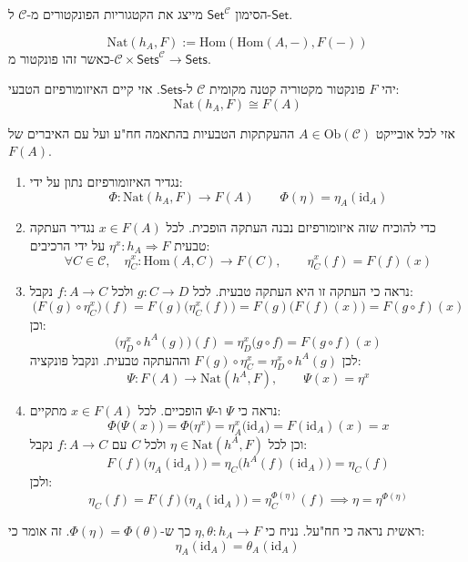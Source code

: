 \documentclass{tstextbook}
\begin{document}
\begin{reminder}
הסימון \(\mathsf{Set}^{\mathcal{C}}\) מייצג את הקטגוריות הפונקטורים מ-\(\mathcal{C}\) ל-\(\mathsf{Set}\).

\end{reminder}
\begin{definition}
$$\mathrm{{Nat}}(h_{A},F):=\mathrm{{Hom}}(\mathrm{{Hom}}(A,-),F(-))$$
כאשר זהו פונקטור מ-\(\mathcal{C}\times \mathsf{Sets}^{\mathcal{C}}\to\mathsf{Sets}\). 

\end{definition}
\begin{proposition}
יהי \(F\) פונקטור מקטוריה קטנה מקומית \(\mathcal{C}\) ל-\(\mathsf{Sets}\). אזי קיים האיזומורפיזם הטבעי:
$$\mathrm{Nat}(h_{A},F)\cong F(A)$$

\end{proposition}
אזי לכל אובייקט \(A \in \mathrm{Ob}\left( \mathcal{C} \right)\) ההעקתקות הטבעיות  בהתאמה חח"ע ועל עם האיברים של \(F(A)\). 

\begin{enumerate}
  \item נגדיר האיזומורפיזם נתון על ידי: 
$$\Phi:\mathrm{Nat}(h_{A},F)\to F(A)\qquad \Phi\left( \eta \right)=\eta_{A}\left( \mathrm{id}_{A} \right)$$


  \item כדי להוכיח שזה איזומורפיזם נבנה העתקה הופכית. לכל \(x \in F(A)\) נגדיר העתקה טבעית \(\eta^{x}:h_{A}\Rightarrow F\) על ידי הרכיבים: 
$$\forall C\in{\mathcal{C}},\quad\eta_{C}^{x}:{\mathrm{Hom}}(A,C)\to F(C),\qquad\eta_{C}^{x}(f)=F(f)(x)$$


  \item נראה כי העתקה זו היא העתקה טבעית. לכל \(g:C\to D\) ולכל \(f:A\to C\) נקבל: 
$$\bigl(F(g)\circ\eta_{C}^{x}\bigr)(f)=F(g)\bigl(\eta_{C}^{x}(f)\bigr)=F(g)\bigl(F(f)(x)\bigr)=F(g\circ f)(x)$$
וכן:
$$\bigl(\eta_{D}^{x}\circ h^{A}(g)\bigr)(f)=\eta_{D}^{x}\bigl(g\circ f\bigr)=F(g\circ f)(x)$$
לכן \(F(g)\circ \eta^x_C=\eta^x_D\circ h^A(g)\) וההעתקה טבעית. ונקבל פונקציה:
$$\Psi:F(A)\rightarrow\mathrm{{Nat}}(h^{A},F),\qquad\Psi(x)=\eta^{x}$$


  \item נראה כי \(\Psi\) ו-\(\Psi\) הופכיים. לכל \(x \in F(A)\) מתקיים: 
$$\Phi{\bigl(}\Psi(x){\bigr)}=\Phi{\bigl(}\eta^{x}{\bigr)}=\eta_{A}^{x}{\bigl(}{\mathrm{id}}_{A}{\bigr)}=F(\mathrm{id}_{A})(x)=x$$
וכן לכל \(\eta \in \mathrm{Nat}(h^{A},F)\) ולכל \(C\) עם \(f:A\to C\) נקבל:
$$F(f){\big(}\eta_{A}(\mathrm{id}_{A}){\big)}=\eta_{C}{\big(}h^{A}(f)(\mathrm{id}_{A}){\big)}=\eta_{C}(f)$$
ולכן:
$$\eta_C(f)=F(f)\big(\eta_A(\mathrm{id}_A)\big)=\eta^{\Phi(\eta)}_C(f)\implies\eta=\eta^{\Phi(\eta)}$$


\end{enumerate}
ראשית נראה כי חח"על. נניח כי \(\eta,\theta:h_{A}\to F\) כך ש-\(\Phi\left( \eta \right)=\Phi\left( \theta \right)\). זה אומר כי:
$$\eta_{A}\left( \mathrm{id}_{A} \right)=\theta_{A}\left( \mathrm{id}_{A} \right)$$
\end{document}
